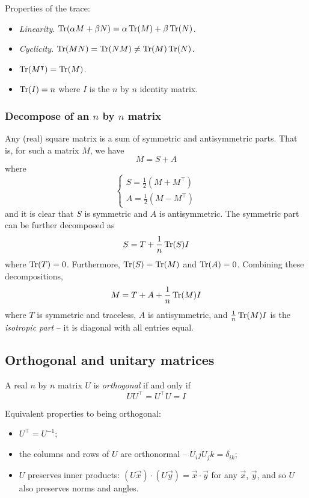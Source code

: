 \documentclass{../template/note}
\begin{document}
    Properties of the trace:

    \begin{itemize}
        \item \emph{Linearity}. \(\operatorname{Tr}(\alpha M + \beta N) = \alpha \operatorname{Tr}(M) + \beta \operatorname{Tr}(N)\).
        \item \emph{Cyclicity}. \(\operatorname{Tr}(MN) = \operatorname{Tr}(NM) \neq \operatorname{Tr}(M)\operatorname{Tr}(N)\).
        \item \(\operatorname{Tr}(M^\intercal) = \operatorname{Tr}(M)\).
        \item \(\operatorname{Tr}(I) = n\) where \(I\) is the \(n\) by \(n\) identity matrix.
    \end{itemize}
    
    \subsubsection{Decompose of an \(n\) by \(n\) matrix}

    Any (real) square matrix is a sum of symmetric and antisymmetric parts. That is, for such a matrix \(M\), we have
    \[
        M = S + A
    \]
    where
    \[
        \begin{cases}
            S = \frac{1}{2} (M + M^\intercal) \\
            A = \frac{1}{2} (M - M^\intercal)
        \end{cases}
    \]
    and it is clear that \(S\) is symmetric and \(A\) is antisymmetric. The symmetric part can be further decomposed as
    \[
        S = T + \frac 1 n \operatorname{Tr}(S) I
    \]
    where \(\operatorname{Tr}(T) = 0\). Furthermore, \(\operatorname{Tr}(S) = \operatorname{Tr}(M)\) and \(\operatorname{Tr}(A) = 0\). Combining these decompositions,
    \[
        M = T + A + \frac 1 n \operatorname{Tr}(M) I
    \]
    where \(T\) is symmetric and traceless, \(A\) is antisymmetric, and \(\frac 1 n \operatorname{Tr}(M) I\) is the \emph{isotropic part} -- it is diagonal with all entries equal.

    
    \subsection{Orthogonal and unitary matrices}

    \begin{definition}
        A real \(n\) by \(n\) matrix \(U\) is \emph{orthogonal} if and only if
        \[
            UU^\intercal = U^\intercal U = I
        \]
    \end{definition}
    Equivalent properties to being orthogonal:
    \begin{itemize}
        \item \(U^\intercal = U^{-1}\);
        \item the columns and rows of \(U\) are orthonormal -- \(U_ijU_jk = \delta_{ik}\);
        \item \(U\) preserves inner products: \((U \vec x) \cdot (U \vec y) = \vec x \cdot \vec y\) for any \(\vec x\), \(\vec y\), and so \(U\) also preserves norms and angles.
    \end{itemize}
    
\end{document}
